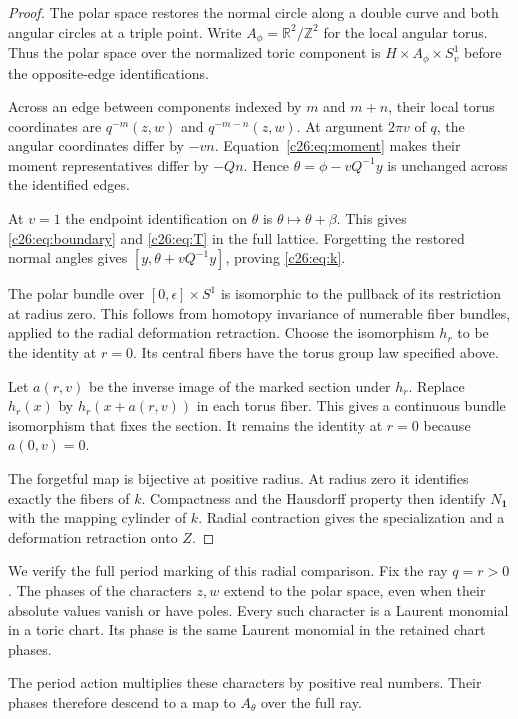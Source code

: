 \begin{proof}
The polar space restores the normal circle along a double curve and
both angular circles at a triple point.
Write $A_\phi=\mathbb R^2/\mathbb Z^2$ for the local angular torus.
Thus the polar space over the normalized toric component is
$H\times A_\phi\times S^1_v$ before the opposite-edge identifications.

Across an edge between components indexed by $m$ and $m+n$, their
local torus coordinates are $q^{-m}(z,w)$ and $q^{-m-n}(z,w)$.
At argument $2\pi v$ of $q$, the angular coordinates differ by $-vn$.
Equation~\eqref{c26:eq:moment} makes their moment representatives
differ by $-Qn$.
Hence $\theta=\phi-vQ^{-1}y$ is unchanged across the identified edges.

At $v=1$ the endpoint identification on $\theta$ is
$\theta\mapsto\theta+\beta$.
This gives \eqref{c26:eq:boundary} and \eqref{c26:eq:T} in the full lattice.
Forgetting the restored normal angles gives
$[y,\theta+vQ^{-1}y]$, proving \eqref{c26:eq:k}.

The polar bundle over $[0,\epsilon]\times S^1$ is isomorphic to the
pullback of its restriction at radius zero.
This follows from homotopy invariance of numerable fiber bundles,
applied to the radial deformation retraction.
Choose the isomorphism $h_r$ to be the identity at $r=0$.
Its central fibers have the torus group law specified above.

Let $a(r,v)$ be the inverse image of the marked section under $h_r$.
Replace $h_r(x)$ by $h_r(x+a(r,v))$ in each torus fiber.
This gives a continuous bundle isomorphism that fixes the section.
It remains the identity at $r=0$ because $a(0,v)=0$.

The forgetful map is bijective at positive radius.
At radius zero it identifies exactly the fibers of $k$.
Compactness and the Hausdorff property then identify $N_{\mathbf1}$ with the
mapping cylinder of $k$. Radial contraction gives the specialization
and a deformation retraction onto $Z$.
\end{proof}

We verify the full period marking of this radial comparison.
Fix the ray $q=r>0$.
The phases of the characters $z,w$ extend to the polar space,
even when their absolute values vanish or have poles.
Every such character is a Laurent monomial in a toric chart.
Its phase is the same Laurent monomial in the retained chart phases.

The period action multiplies these characters by positive real numbers.
Their phases therefore descend to a map to $A_\theta$ over the full ray.

